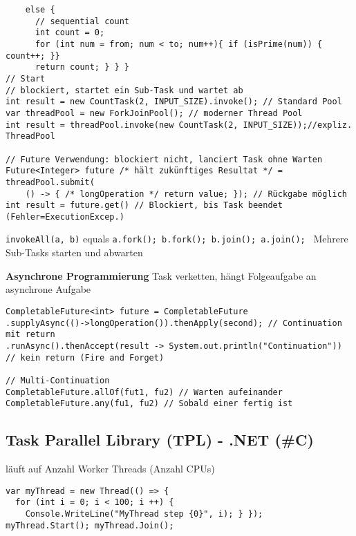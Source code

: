 \begin{lstlisting}
    else {
      // sequential count
      int count = 0;
      for (int num = from; num < to; num++){ if (isPrime(num)) { count++; }}
      return count; } } }
// Start
// blockiert, startet ein Sub-Task und wartet ab
int result = new CountTask(2, INPUT_SIZE).invoke(); // Standard Pool
var threadPool = new ForkJoinPool(); // moderner Thread Pool
int result = threadPool.invoke(new CountTask(2, INPUT_SIZE));//expliz. ThreadPool

// Future Verwendung: blockiert nicht, lanciert Task ohne Warten
Future<Integer> future /* hält zukünftiges Resultat */ = threadPool.submit(
    () -> { /* longOperation */ return value; }); // Rückgabe möglich
int result = future.get() // Blockiert, bis Task beendet (Fehler=ExecutionExcep.)
\end{lstlisting}

\lstinline{invokeAll(a, b)} equals \lstinline{a.fork(); b.fork(); b.join(); a.join(); } Mehrere Sub-Tasks starten und abwarten

\textbf{Asynchrone Programmierung}
Task verketten, hängt Folgeaufgabe an asynchrone Aufgabe
\begin{lstlisting}
CompletableFuture<int> future = CompletableFuture
.supplyAsync(()->longOperation()).thenApply(second); // Continuation mit return
.runAsync().thenAccept(result -> System.out.println("Continuation")) // kein return (Fire and Forget)

// Multi-Continuation
CompletableFuture.allOf(fut1, fu2) // Warten aufeinander
CompletableFuture.any(fu1, fu2) // Sobald einer fertig ist
\end{lstlisting}




\subsection{Task Parallel Library (TPL) - .NET (\#C)}
läuft auf Anzahl Worker Threads (Anzahl CPUs)
\begin{lstlisting}
var myThread = new Thread(() => {
  for (int i = 0; i < 100; i ++) {
    Console.WriteLine("MyThread step {0}", i); } });
myThread.Start(); myThread.Join();
\end{lstlisting}


